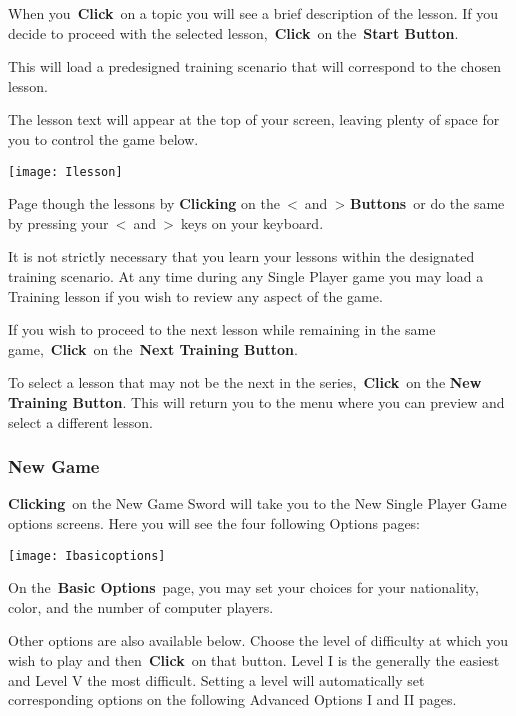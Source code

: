 When you \textbf{Click} on a topic you will see a brief description of the lesson. If you decide to proceed with the selected lesson, \textbf{Click} on the \textbf{Start Button}.

This will load a predesigned training scenario that will correspond to the chosen lesson.

The lesson text will appear at the top of your screen, leaving plenty of space for you to control the game below.

\begin{center}
\texttt{[image: Ilesson]}
\end{center}

Page though the lessons by \textbf{Clicking} on the \textless and \textgreater \hspace{1pt} \textbf{Buttons} or do the same by pressing your \textless and \textgreater keys on your keyboard.

It is not strictly necessary that you learn your lessons within the designated training scenario. At any time during any Single Player game you may load a Training lesson if you wish to review any aspect of the game.

If you wish to proceed to the next lesson while remaining in the same game, \textbf{Click} on the \textbf{Next Training Button}.

To select a lesson that may not be the next in the series, \textbf{Click} on the \textbf{New Training Button}. This will return you to the menu where you can preview and select a different lesson.

\clearpage

\subsubsection{New Game}

\textbf{Clicking} on the New Game Sword will take you to the New Single Player Game options screens. Here you will see the four following Options pages:

\begin{center}
	\texttt{[image: Ibasicoptions]}
\end{center}

On the \textbf{Basic Options} page, you may set your choices for your nationality, color, and the number of computer players.

Other options are also available below. Choose the level of difficulty at which you wish to play and then \textbf{Click} on that button. Level I is the generally the easiest and Level V the most difficult. Setting a level will automatically set corresponding options on the following Advanced Options I and II pages.

